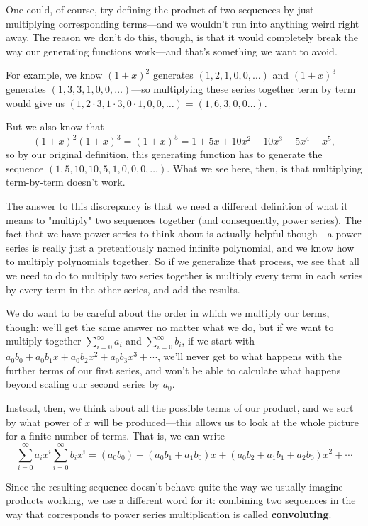 \documentclass{article}
\theoremstyle{definition}
\begin{document}
One could, of course, try defining the product of two sequences by just multiplying corresponding terms---and we wouldn't run into anything weird right away. The reason we don't do this, though, is that it would completely break the way our generating functions work---and that's something we want to avoid.

For example, we know $(1+x)^{2}$ generates $(1,2,1,0,0, \ldots)$ and $(1+x)^{3}$ generates $(1,3,3,1,0,0, \ldots)$---so multiplying these series together term by term would give us $(1,2 \cdot 3,1 \cdot 3,0 \cdot 1,0,0, \ldots)=(1,6,3,0,0 \ldots)$.

But we also know that
\[(1+x)^{2}(1+x)^{3}=(1+x)^{5}=1+5 x+10 x^{2}+10 x^{3}+5 x^{4}+x^{5},\]
so by our original definition, this generating function has to generate the sequence $(1,5,10,10,5,1,0,0,0, \ldots)$. What we see here, then, is that multiplying term-by-term doesn't work.

The answer to this discrepancy is that we need a different definition of what it means to "multiply" two sequences together (and consequently, power series). The fact that we have power series to think about is actually helpful though---a power series is really just a pretentiously named infinite polynomial, and we know how to multiply polynomials together. So if we generalize that process, we see that all we need to do to multiply two series together is multiply every term in each series by every term in the other series, and add the results.

We do want to be careful about the order in which we multiply our terms, though: we'll get the same answer no matter what we do, but if we want to multiply together $\sum_{i=0}^{\infty} a_{i}$ and $\sum_{i=0}^{\infty} b_{i}$, if we start with $a_{0} b_{0}+a_{0} b_{1} x+a_{0} b_{2} x^{2}+a_{0} b_{3} x^{3}+\cdots$, we'll never get to what happens with the further terms of our first series, and won't be able to calculate what happens beyond scaling our second series by $a_{0}$.

Instead, then, we think about all the possible terms of our product, and we sort by what power of $x$ will be produced---this allows us to look at the whole picture for a finite number of terms. That is, we can write
\[\sum_{i=0}^{\infty} a_{i} x^{i} \sum_{i=0}^{\infty} b_{i} x^{i}=\left(a_{0} b_{0}\right)+\left(a_{0} b_{1}+a_{1} b_{0}\right) x+\left(a_{0} b_{2}+a_{1} b_{1}+a_{2} b_{0}\right) x^{2}+\cdots\]

Since the resulting sequence doesn't behave quite the way we usually imagine products working, we use a different word for it: combining two sequences in the way that corresponds to power series multiplication is called \textbf{convoluting}.
\end{document}
